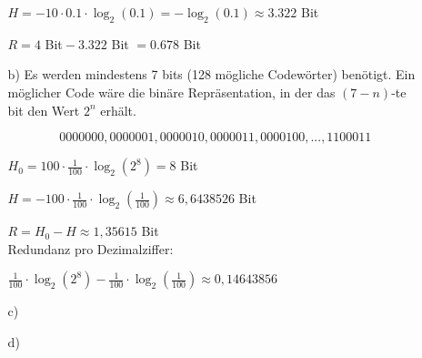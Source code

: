 \documentclass[a4paper,10pt]{scrartcl}
\begin{document}
\begin{enumerate}
\begin{enumerate}
                $H = - 10 \cdot 0.1 \cdot \log_2(0.1) = -\log_2(0.1) \approx 3.322$ Bit

                $R = 4$ Bit${}- 3.322$ Bit $= 0.678$ Bit

            \item[b)]
                Es werden mindestens 7 bits (128 mögliche Codewörter) benötigt. Ein möglicher
                Code wäre die binäre Repräsentation, in der das $(7-n)$-te bit den Wert $2^n$
                erhält.

                $$0000000, 0000001, 0000010, 0000011, 0000100, ..., 1100011$$
				

				$H_0 = 100 \cdot \frac{1}{100} \cdot \log_2(2^8) = 8 $ Bit

                $H = - 100 \cdot \frac{1}{100} \cdot \log_2(\frac{1}{100}) \approx 6,6438526$ Bit %
                
                $ R = H_0 - H \approx 1,35615$ Bit \\
              
                Redundanz pro Dezimalziffer:
                
                $\frac{1}{100} \cdot \log_2(2^8) -  \frac{1}{100} \cdot \log_2(\frac{1}{100}) \approx 0,14643856$
                
            \item[c)]

            \item[d)]
                
        \end{enumerate}
\end{enumerate}
\end{document}

